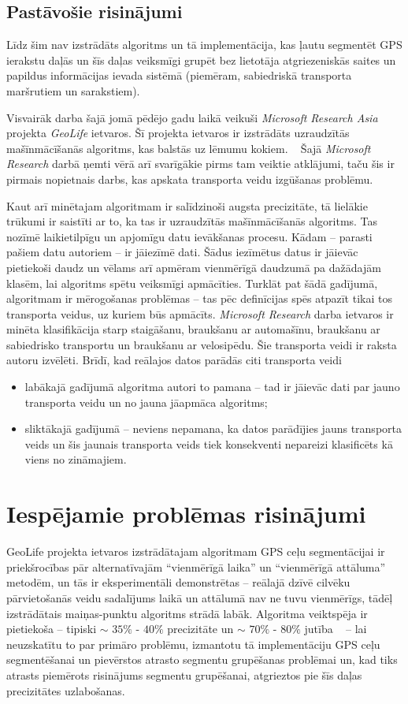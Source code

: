 \documentclass{ludis}
\begin{document}
\section{Pastāvošie risinājumi}
Līdz šim nav izstrādāts algoritms un tā implementācija, kas ļautu segmentēt GPS ierakstu daļās un 
šīs daļas veiksmīgi grupēt bez lietotāja atgriezeniskās saites un papildus informācijas ievada
sistēmā (piemēram, sabiedriskā transporta maršrutiem un sarakstiem).

Visvairāk darba šajā jomā pēdējo gadu laikā veikuši \emph{Microsoft Research Asia} projekta
\emph{GeoLife} ietvaros. Šī projekta ietvaros ir izstrādāts uzraudzītās mašīnmācīšanās 
algoritms, kas balstās uz lēmumu kokiem. ~\cite{zheng_gps_segmentation} Šajā \emph{Microsoft Research}
darbā ņemti vērā arī svarīgākie pirms tam veiktie atklājumi, taču šis ir pirmais nopietnais
darbs, kas apskata transporta veidu izgūšanas problēmu.

Kaut arī minētajam algoritmam ir salīdzinoši augsta precizitāte, tā lielākie trūkumi ir saistīti
ar to, ka tas ir uzraudzītās mašīnmācīšanās algoritms. Tas nozīmē laikietilpīgu un apjomīgu datu
ievākšanas procesu. Kādam -- parasti pašiem datu autoriem -- ir jāiezīmē dati. Šādus iezīmētus
datus ir jāievāc pietiekoši daudz un vēlams arī apmēram vienmērīgā daudzumā pa dažādajām klasēm,
lai algoritms spētu veiksmīgi apmācīties. Turklāt pat šādā gadījumā, algoritmam ir mērogošanas
problēmas -- tas pēc definīcijas spēs atpazīt tikai tos transporta veidus, uz kuriem būs
apmācīts. \emph{Microsoft Research} darba ietvaros ir minēta klasifikācija starp staigāšanu,
braukšanu ar automašīnu, braukšanu ar sabiedrisko transportu un braukšanu ar velosipēdu. Šie
transporta veidi ir raksta autoru izvēlēti. Brīdī, kad reālajos datos parādās citi transporta
veidi
\begin{itemize}
\item labākajā gadījumā algoritma autori to pamana -- tad ir jāievāc dati par jauno transporta
  veidu un no jauna jāapmāca algoritms;
\item sliktākajā gadījumā -- neviens nepamana, ka datos parādījies jauns transporta veids un šis
  jaunais transporta veids tiek konsekventi nepareizi klasificēts kā viens no zināmajiem.
\end{itemize}

\chapter{Iespējamie problēmas risinājumi}
GeoLife projekta ietvaros izstrādātajam algoritmam GPS ceļu segmentācijai ir priekšrocības 
pār alternatīvajām ``vienmērīgā laika'' un ``vienmērīgā attāluma'' metodēm, un tās ir
eksperimentāli demonstrētas -- reālajā dzīvē cilvēku pārvietošanās veidu sadalījums laikā 
un attālumā nav ne tuvu vienmērīgs, tādēļ izstrādātais maiņas-punktu algoritms strādā labāk.
Algoritma veiktspēja ir pietiekoša -- tipiski $\sim$ $35\%$ - $40\%$
precizitāte un $\sim$ $70\%$ - $80\%$ jutība ~\cite{zheng_gps_segmentation} -- 
lai neuzskatītu to par primāro problēmu, izmantotu tā implementāciju GPS ceļu segmentēšanai 
un pievērstos atrasto segmentu grupēšanas problēmai un, kad tiks atrasts piemērots risinājums
segmentu grupēšanai, atgrieztos pie šīs daļas precizitātes uzlabošanas.
\end{document}
